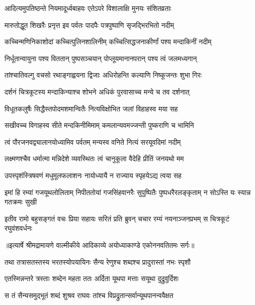\twolineshloka
{आदित्यमुपतिष्ठन्ते नियमादूर्ध्वबाहवः}
{एतेऽपरे विशालाक्षि मुनयः संशितव्रताः} %

\twolineshloka
{मारुतोद्धूत शिखरैः प्रनृत्त इव पर्वतः}
{पादपैः पत्रपुष्पाणि सृजद्भिरभितो नदीम्} %

\twolineshloka
{कच्चिन्मणिनिकाशोदां कच्चित्पुलिनशालिनीम्}
{कच्चित्सिद्धजनाकीर्णां पश्य मन्दाकिनीं नदीम्} %

\twolineshloka
{निर्धूतान्वायुना पश्य विततान् पुष्पसञ्चयान्}
{पोप्लूयमानानपरान् पश्य त्वं जलमध्यगान्} %

\twolineshloka
{तांश्चातिवल्गु वचसो रथाङ्गाह्वयना द्विजाः}
{अधिरोहन्ति कल्याणि निष्कूजन्तः शुभा गिरः} %

\twolineshloka
{दर्शनं चित्रकूटस्य मन्दाकिन्याश्च शोभने}
{अधिकं पुरवासाच्च मन्ये च तव दर्शनात्} %

\twolineshloka
{विधूतकलुषैः सिद्धैस्तपोदमशमान्वितैः}
{नित्यविक्षोभित जलां विहाहस्व मया सह} %

\twolineshloka
{सखीवच्च विगाहस्व सीते मन्दकिनीमिमाम्}
{कमलान्यवमज्जन्ती पुष्कराणि च भामिनि} %

\twolineshloka
{त्वं पौरजनवद्व्यालानयोध्यामिव पर्वतम्}
{मन्यस्व वनिते नित्यं सरयूवदिमां नदीम्} %

\twolineshloka
{लक्ष्मणश्चैव धर्मात्मा मन्निदेशे व्यवस्थितः}
{त्वं चानुकूला वैदेहि प्रीतिं जनयथो मम} %

\twolineshloka
{उपस्पृशंस्त्रिषवणं मधुमूलफलाशनः}
{नायोध्यायै न राज्याय स्पृहयेऽद्य त्वया सह} %

\fourlineindentedshloka
{इमां हि रम्यां गजयूथलोलिताम्}
{निपीततोयां गजसिंहवानरैः}
{सुपुष्पितैः पुष्पधरैरलङ्कृताम्}
{न सोऽस्ति यः स्यान्न गतक्रमः सुखी} %

\fourlineindentedshloka
{इतीव रामो बहुसङ्गतं वचः}
{प्रिया सहायः सरितं प्रति ब्रुवन्}
{चचार रम्यं नयनाञ्जनप्रभम्}
{स चित्रकूटं रघुवंशवर्धनः} %


{॥इत्यार्षे श्रीमद्रामायणे वाल्मीकीये आदिकाव्ये अयोध्याकाण्डे एकोननवतितमः सर्गः॥}


\twolineshloka
{तथा तत्रासतस्तस्य भरतस्योपयायिनः}
{सैन्य रेणुश्च शब्दश्च प्रादुरास्तां नभः स्पृशौ} %

\twolineshloka
{एतस्मिन्नन्तरे त्रस्ताः शब्देन महता ततः}
{अर्दिता यूथपा मत्ताः सयूथा दुद्रुवुर्दिशः} %

\twolineshloka
{स तं सैन्यसमुद्भूतं शब्दं शुश्रव राघवः}
{तांश्च विप्रद्रुतान्सर्वान्यूथपानन्ववैक्षत} %

